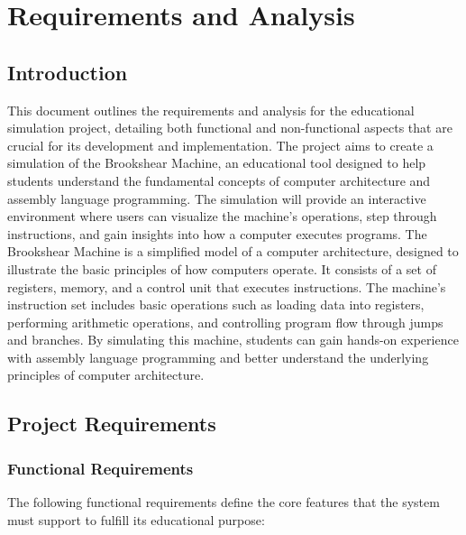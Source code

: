 \chapter{Requirements and Analysis}

\label{chap:requirements}
\section{Introduction}
This document outlines the requirements and analysis for the educational simulation project, detailing both functional and non-functional aspects that are crucial for its development and implementation.
The project aims to create a simulation of the Brookshear Machine, an educational tool designed to help students understand the fundamental concepts of computer architecture and assembly language programming. The simulation will provide an interactive environment where users can visualize the machine's operations, step through instructions, and gain insights into how a computer executes programs.
The Brookshear Machine is a simplified model of a computer architecture, designed to illustrate the basic principles of how computers operate. It consists of a set of registers, memory, and a control unit that executes instructions. The machine's instruction set includes basic operations such as loading data into registers, performing arithmetic operations, and controlling program flow through jumps and branches. By simulating this machine, students can gain hands-on experience with assembly language programming and better understand the underlying principles of computer architecture.

\section{Project Requirements}

\subsection{Functional Requirements}

The following functional requirements define the core features that the system must support to fulfill its educational purpose:

